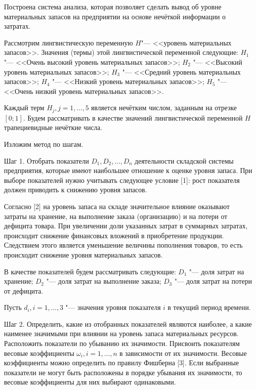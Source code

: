 
\vzmscaption

Построена система анализа, которая позволяет сделать вывод об уровне материальных запасов на предприятии на основе нечёткой информации о затратах.

Рассмотрим лингвистическую переменную $H$"--- <<уровень материальных запасов>>. Значения (термы) этой лингвистической переменной следующие:
$H_{1}$ "--- <<Очень высокий уровень материальных запасов>>;
$H_{2}$ "--- <<Высокий уровень материальных запасов>>;
$H_{3}$ "--- <<Средний уровень материальных запасов>>;
$H_{4}$ "--- <<Низкий уровень материальных запасов>>;
$H_{5}$ "--- <<Очень низкий уровень материальных запасов>>.


Каждый терм $H_{j}, j = 1, \ldots, 5$ является нечётким числом, заданным на отрезке $[0; 1]$. Будем рассматривать в качестве значений лингвистической переменной $H$ трапециевидные нечёткие числа.

Изложим метод по шагам.

Шаг 1. Отобрать показатели $D_{1}, D_{2}, \ldots, D_{n}$ деятельности складской системы предприятия, которые имеют наибольшее отношение к оценке уровня запаса. При выборе показателей нужно учитывать следующее условие [1]: рост показателя должен приводить к снижению уровня запасов.

Согласно [2] на уровень запаса на складе значительное влияние оказывают затраты на хранение, на выполнение заказа (организацию) и на потери от дефицита товара. При увеличении доли указанных затрат в суммарных затратах, происходит снижение финансовых вложений в приобретение продукции. Следствием этого является уменьшение величины пополнения товаров, то есть происходит снижение уровня материальных запасов.

В качестве показателей будем рассматривать следующие:
$D_{1}$ "--- доля затрат на хранение;
$D_{2}$ "--- доля затрат на выполнение заказа;
$D_{3}$ "--- доля затрат на потери от дефицита.

Пусть $d_{i}, i = 1, \ldots, 3$ "--- значения уровня показателя $i$ в текущий период времени.

Шаг 2.
Определить, какие из отобранных показателей являются наиболее, а какие наименее значимыми при влиянии на уровень запаса материальных ресурсов. Расположить показатели по убыванию их значимости.
Присвоить показателям весовые коэффициенты $\omega_{i}, i = 1, \ldots, n$ в зависимости от их значимости.
Весовые коэффициенты можно определить по правилу Фишберна [3].
Если выбранные показатели не могут быть расположены в порядке убывания их значимости, то весовые коэффициенты для них выбирают одинаковыми.


